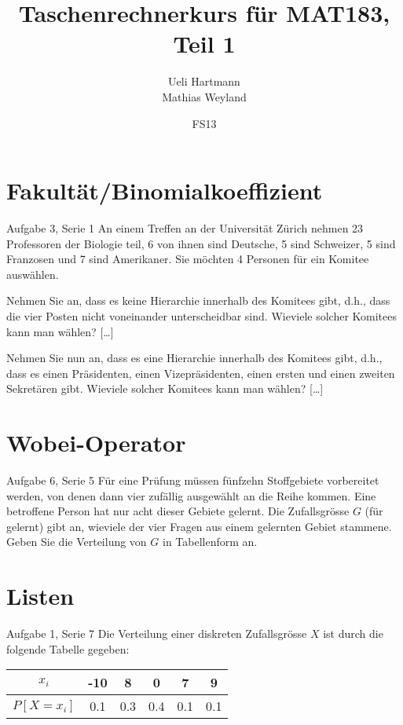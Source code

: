 \documentclass{beamer}
\title{Taschenrechnerkurs für MAT183, Teil 1}
\author{Ueli Hartmann\\Mathias Weyland}
\date{FS13}
\begin{document}
\frame{\maketitle}


\section{Fakultät/Binomialkoeffizient}

\begin{frame}{Aufgabe 3, Serie 1}
An einem Treffen an der Universität Zürich nehmen 23 Professoren der Biologie teil, 6 von
ihnen sind Deutsche, 5 sind Schweizer, 5 sind Franzosen und 7 sind Amerikaner.
Sie möchten 4 Personen für ein Komitee auswählen.

\begin{outline}
\item Nehmen Sie an, dass es keine Hierarchie innerhalb des Komitees gibt, d.h., dass die
vier Posten nicht voneinander unterscheidbar sind. Wieviele solcher Komitees kann
man wählen? [\ldots]\pause
\item Nehmen Sie nun an, dass es eine Hierarchie innerhalb des Komitees gibt, d.h., dass es
einen Präsidenten, einen Vizepräsidenten, einen ersten und einen zweiten
Sekretären gibt. Wieviele solcher Komitees kann man wählen? [\ldots]
\end{outline}
\end{frame}

\section{Wobei-Operator}
\begin{frame}{Aufgabe 6, Serie 5}
Für eine Prüfung müssen fünfzehn Stoffgebiete vorbereitet werden, von denen dann
vier zufällig ausgewählt an die Reihe kommen. Eine betroffene Person hat nur
acht dieser Gebiete gelernt. Die Zufallsgrösse $G$ (für gelernt) gibt an,
wieviele der vier Fragen aus einem gelernten Gebiet stammene. Geben Sie die
Verteilung von $G$ in Tabellenform an.
\end{frame}

\section{Listen}
\begin{frame}{Aufgabe 1, Serie 7}
Die Verteilung einer diskreten Zufallsgrösse $X$ ist durch die folgende Tabelle gegeben:

\begin{center}\begin{tabular}{c|ccccc}\toprule
$x_i$     & -10 & 8   & 0 & 7 & 9\\\midrule
$P[X=x_i]$& 0.1 & 0.3 & 0.4 & 0.1 & 0.1\\\bottomrule
\end{tabular}\end{center}
\end{frame}
\end{document}
